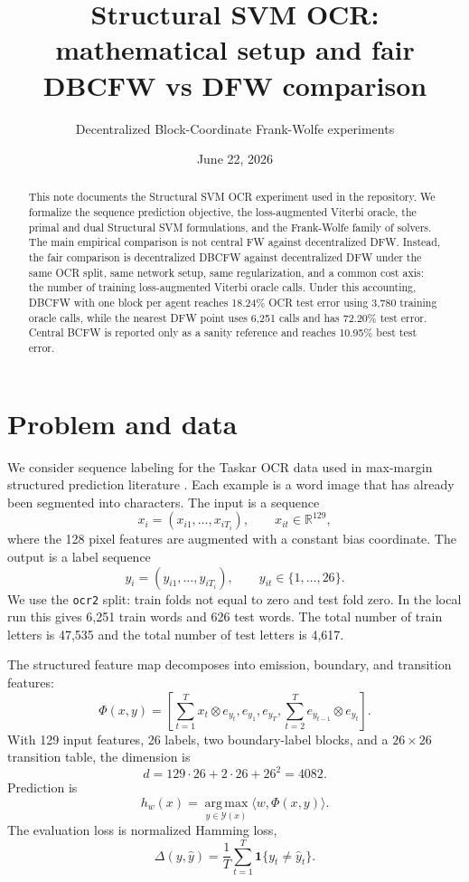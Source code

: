 \documentclass[11pt,a4paper]{article}
\title{\textbf{Structural SVM OCR: mathematical setup and fair DBCFW vs DFW comparison}}
\author{Decentralized Block-Coordinate Frank-Wolfe experiments}
\date{June 22, 2026}
\newcommand{\R}{\mathbb{R}}
\newcommand{\Y}{\mathcal{Y}}
\newcommand{\argmax}{\operatorname*{arg\,max}}
\begin{document}
\maketitle

\begin{abstract}
This note documents the Structural SVM OCR experiment used in the repository. We formalize the sequence prediction objective, the loss-augmented Viterbi oracle, the primal and dual Structural SVM formulations, and the Frank-Wolfe family of solvers. The main empirical comparison is not central FW against decentralized DFW. Instead, the fair comparison is decentralized DBCFW against decentralized DFW under the same OCR split, same network setup, same regularization, and a common cost axis: the number of training loss-augmented Viterbi oracle calls. Under this accounting, DBCFW with one block per agent reaches 18.24\% OCR test error using 3,780 training oracle calls, while the nearest DFW point uses 6,251 calls and has 72.20\% test error. Central BCFW is reported only as a sanity reference and reaches 10.95\% best test error.
\end{abstract}

\section{Problem and data}

We consider sequence labeling for the Taskar OCR data used in max-margin structured prediction literature \citep{taskar2003maxmargin,lacostejulien2013bcfw}. Each example is a word image that has already been segmented into characters. The input is a sequence
\[
  x_i = (x_{i1},\ldots,x_{iT_i}), \qquad x_{it}\in\R^{129},
\]
where the 128 pixel features are augmented with a constant bias coordinate. The output is a label sequence
\[
  y_i = (y_{i1},\ldots,y_{iT_i}), \qquad y_{it}\in\{1,\ldots,26\}.
\]
We use the \texttt{ocr2} split: train folds not equal to zero and test fold zero. In the local run this gives 6,251 train words and 626 test words. The total number of train letters is 47,535 and the total number of test letters is 4,617.

The structured feature map decomposes into emission, boundary, and transition features:
\[
  \Phi(x,y) =
  \left[
    \sum_{t=1}^{T} x_t \otimes e_{y_t},
    e_{y_1},
    e_{y_T},
    \sum_{t=2}^{T} e_{y_{t-1}}\otimes e_{y_t}
  \right].
\]
With 129 input features, 26 labels, two boundary-label blocks, and a \(26\times26\) transition table, the dimension is
\[
  d = 129\cdot 26 + 2\cdot 26 + 26^2 = 4082.
\]
Prediction is
\[
  h_w(x) = \argmax_{y\in\Y(x)} \langle w,\Phi(x,y)\rangle .
\]
The evaluation loss is normalized Hamming loss,
\[
  \Delta(y,\hat y) = \frac{1}{T}\sum_{t=1}^{T}\mathbf{1}\{y_t\neq \hat y_t\}.
\]
\end{document}
